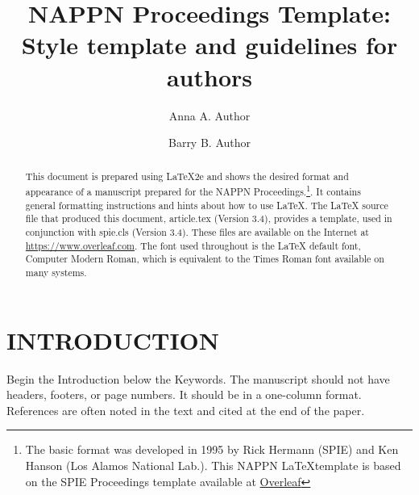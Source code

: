 \documentclass[]{spie}  %
\title{NAPPN Proceedings Template: Style template and guidelines for authors}
\author[a,$\dag$]{Anna A. Author}
\author[b]{Barry B. Author}
\affil[a]{Affiliation1, Address, ORCiD}
\affil[b]{Affiliation2, Address}
\affil[$\dag$]{Presenting author}
\begin{document}
 
\maketitle

\begin{abstract}
This document is prepared using LaTeX2e\cite{Lamport94} and shows the desired format and appearance of a manuscript prepared for the NAPPN Proceedings.\footnote{The basic format was developed in 1995 by Rick Hermann (SPIE) and Ken Hanson (Los Alamos National Lab.). This NAPPN \LaTeX template is based on the SPIE Proceedings template available at \href{https://www.overleaf.com/latex/templates/spie-proceedings-style-template-and-guidelines-for-authors/qpkhfttzvnhz}{Overleaf}}. It contains general formatting instructions and hints about how to use LaTeX.  The LaTeX source file that produced this document, {\ttfamily article.tex} (Version 3.4), provides a template, used in conjunction with {\ttfamily spie.cls} (Version 3.4). These files are available on the Internet at \url{https://www.overleaf.com}.  The font used throughout is the LaTeX default font, Computer Modern Roman, which is equivalent to the Times Roman font available on many systems.  
\end{abstract}


\section{INTRODUCTION}
\label{sec:intro}  %

Begin the Introduction below the Keywords. The manuscript should not have headers, footers, or page numbers. It should be in a one-column format. References are often noted in the text and cited at the end of the paper.
\end{document}

